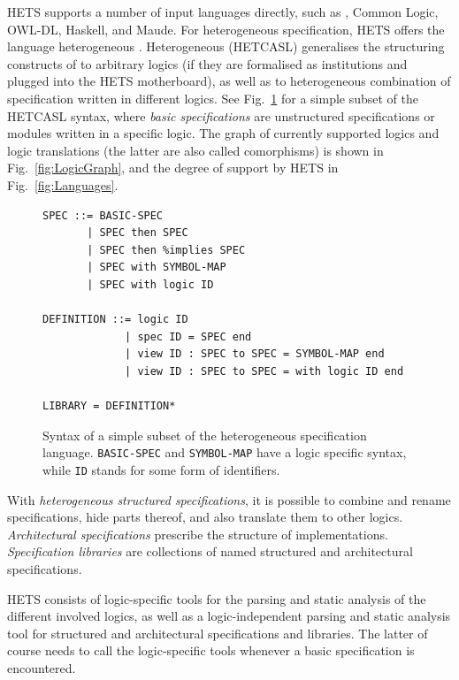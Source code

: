 \documentclass{article}
\newcommand{\normalTEXTSC}[2]{{#1\scriptsize#2}}
\newcommand     {\Hets}{\normalTEXTSC{H}{ETS}\xspace}
\newcommand{\HetCASL}{\normalTEXTSC{H}{ET}\normalTEXTSC{C}{ASL}\xspace}
\begin{document}
\Hets supports a number of input languages directly, such as \CASL,
Common Logic, OWL-DL, Haskell, and Maude. For heterogeneous
specification, \Hets offers the language heterogeneous \CASL.
Heterogeneous \CASL (\HetCASL) generalises the structuring
constructs of
\CASL \cite{CASL-UM,CASL/RefManual} to arbitrary logics
(if they are formalised as institutions and plugged into
the \Hets motherboard), as well as to heterogeneous
combination of specification written in different logics.
See
Fig.~\ref{fig:lang} for a simple subset of the
\HetCASL syntax, where \emph{basic specifications} are unstructured
specifications or modules written in a specific logic.  The graph of
currently supported logics and logic translations (the latter are also
called comorphisms) is shown in Fig.~\ref{fig:LogicGraph}, and the
degree of support by \Hets in Fig.~\ref{fig:Languages}.

\begin{figure}[ht]
\centering
{\small
\begin{verbatim}
SPEC ::= BASIC-SPEC
       | SPEC then SPEC
       | SPEC then %implies SPEC
       | SPEC with SYMBOL-MAP
       | SPEC with logic ID

DEFINITION ::= logic ID
             | spec ID = SPEC end
             | view ID : SPEC to SPEC = SYMBOL-MAP end
             | view ID : SPEC to SPEC = with logic ID end

LIBRARY = DEFINITION*
\end{verbatim}
}
\caption{Syntax of a simple subset of the heterogeneous
specification language.
\texttt{BASIC-SPEC} and \texttt{SYMBOL-MAP} have a logic
specific syntax, while \texttt{ID} stands for some form of
identifiers.\label{fig:lang}
}
\end{figure}

With \emph{heterogeneous structured specifications}, it is possible to
combine and rename specifications, hide parts thereof, and also
translate them to other logics. \emph{Architectural specifications}
prescribe the structure of implementations.  \emph{Specification
  libraries} are collections of named structured and architectural
specifications.

\Hets consists of logic-specific tools for the parsing and static
analysis of the different involved logics, as well as a
logic-independent parsing and static analysis tool for structured and
architectural specifications and libraries. The latter of course needs
to call the logic-specific tools whenever a basic specification is
encountered.
\end{document}
